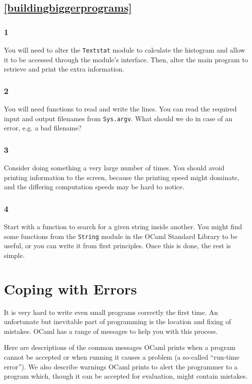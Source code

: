 \documentclass[]{book}
\begin{document}
\section*{\ref{buildingbiggerprograms}\\ }

\subsection*{1}
You will need to alter the \texttt{Textstat} module to calculate the histogram and allow it to be accessed through the module's interface. Then, alter the main program to retrieve and print the extra information.

\subsection*{2}
You will need functions to read and write the lines. You can read the required input and output filenames from \texttt{Sys.argv}. What should we do in case of an error, e.g. a bad filename?

\subsection*{3}
Consider doing something a very large number of times. You should avoid printing information to the screen, because the printing speed might dominate, and the differing computation speeds may be hard to notice.

\subsection*{4}
Start with a function to search for a given string inside another. You might find some functions from the \texttt{String} module in the OCaml Standard Library to be useful, or you can write it from first principles. Once this is done, the rest is simple.

\cleardoublepage
\chapter{Coping with Errors}
It is very hard to write even small programs correctly the first time. An unfortunate but inevitable part of programming is the location and fixing of mistakes. OCaml has a range of messages to help you with this process.

Here are descriptions of the common messages OCaml prints when a program cannot be accepted or when running it causes a problem (a so-called ``run-time error''). We also describe warnings OCaml prints to alert the programmer to a program which, though it can be accepted for evaluation, might contain mistakes.
\end{document}
